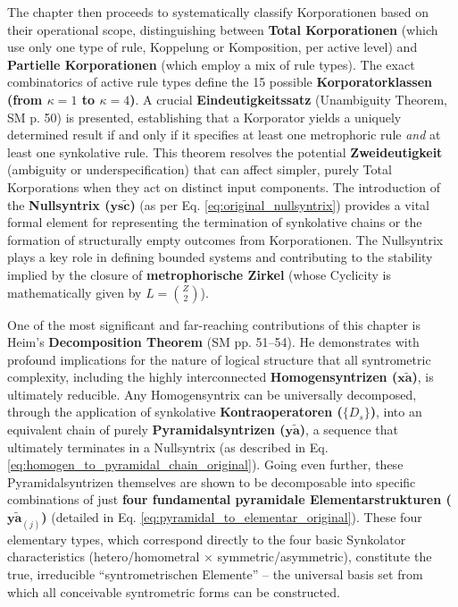 \documentclass[12pt]{article}
\newcommand{\q}[1]{\enquote{#1}}
\newcommand{\syntrix}{\bm{y\widetilde{a}}}
\newcommand{\homogeneoussyntrix}{\bm{x\widetilde{a}}}
\newcommand{\nullsyntrix}{\bm{ys\widetilde{c}}}
\newcommand{\elementarstruktur}{\bm{y\widetilde{a}}_{(j)}}
\begin{document}
The chapter then proceeds to systematically classify Korporationen based on their operational scope, distinguishing between \textbf{Total Korporationen} (which use only one type of rule, Koppelung or Komposition, per active level) and \textbf{Partielle Korporationen} (which employ a mix of rule types). The exact combinatorics of active rule types define the 15 possible \textbf{Korporatorklassen (from \( \kappa=1 \) to \( \kappa=4 \))}. A crucial \textbf{Eindeutigkeitssatz} (Unambiguity Theorem, SM p. 50) is presented, establishing that a Korporator yields a uniquely determined result if and only if it specifies at least one metrophoric rule \textit{and} at least one synkolative rule. This theorem resolves the potential \textbf{Zweideutigkeit} (ambiguity or underspecification) that can affect simpler, purely Total Korporations when they act on distinct input components. The introduction of the \textbf{Nullsyntrix (\( \nullsyntrix \))} (as per Eq. \eqref{eq:original_nullsyntrix}) provides a vital formal element for representing the termination of synkolative chains or the formation of structurally empty outcomes from Korporationen. The Nullsyntrix plays a key role in defining bounded systems and contributing to the stability implied by the closure of \textbf{metrophorische Zirkel} (whose Cyclicity is mathematically given by \( L = \binom{Z}{2} \)).

One of the most significant and far-reaching contributions of this chapter is Heim's \textbf{Decomposition Theorem} (SM pp. 51–54). He demonstrates with profound implications for the nature of logical structure that all syntrometric complexity, including the highly interconnected \textbf{Homogensyntrizen (\(\homogeneoussyntrix\))}, is ultimately reducible. Any Homogensyntrix can be universally decomposed, through the application of synkolative \textbf{Kontraoperatoren (\( \{D_s\} \))}, into an equivalent chain of purely \textbf{Pyramidalsyntrizen (\(\syntrix\))}, a sequence that ultimately terminates in a Nullsyntrix (as described in Eq. \eqref{eq:homogen_to_pyramidal_chain_original}). Going even further, these Pyramidalsyntrizen themselves are shown to be decomposable into specific combinations of just \textbf{four fundamental pyramidale Elementarstrukturen (\(\elementarstruktur\))} (detailed in Eq. \eqref{eq:pyramidal_to_elementar_original}). These four elementary types, which correspond directly to the four basic Synkolator characteristics (hetero/homometral \( \times \) symmetric/asymmetric), constitute the true, irreducible \q{syntrometrischen Elemente} – the universal basis set from which all conceivable syntrometric forms can be constructed.
\end{document}
